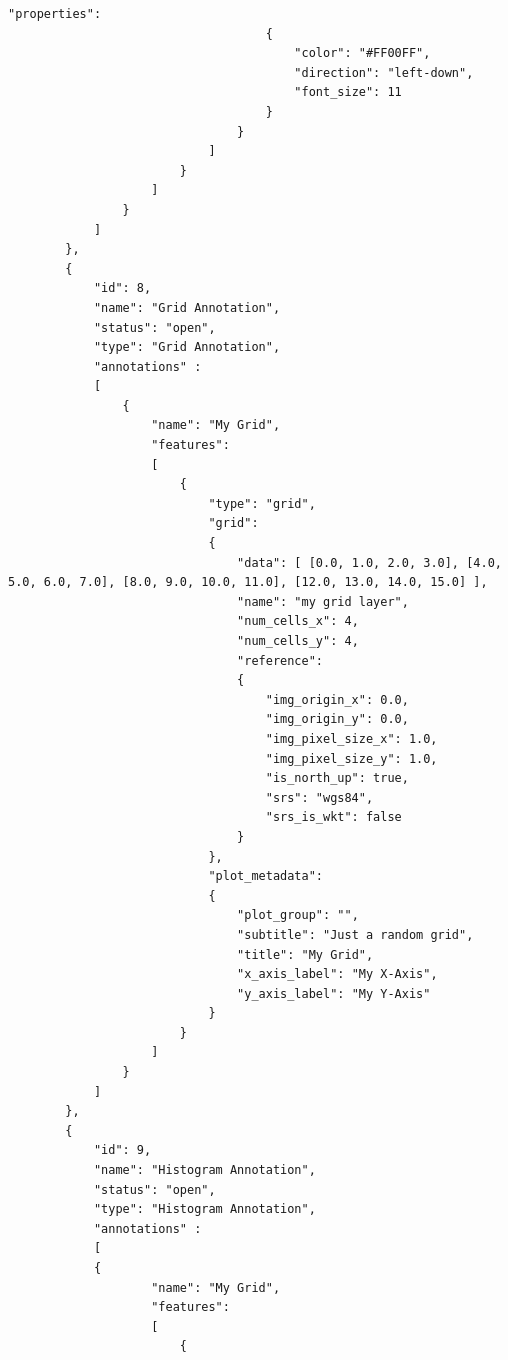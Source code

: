 \begin{lstlisting}[basicstyle=\small\ttfamily]
                                    "properties":
                                    {
                                        "color": "#FF00FF",
                                        "direction": "left-down",
                                        "font_size": 11
                                    }
                                }
                            ]
                        }
                    ]
                }                
            ]
        },
        {
            "id": 8,
            "name": "Grid Annotation",
            "status": "open",
            "type": "Grid Annotation",
            "annotations" :
            [
                {
                    "name": "My Grid",
                    "features":
                    [
                        {
                            "type": "grid",
                            "grid": 
                            {
                                "data": [ [0.0, 1.0, 2.0, 3.0], [4.0, 5.0, 6.0, 7.0], [8.0, 9.0, 10.0, 11.0], [12.0, 13.0, 14.0, 15.0] ],
                                "name": "my grid layer",
                                "num_cells_x": 4,
                                "num_cells_y": 4,
                                "reference": 
                                {
                                    "img_origin_x": 0.0,     
                                    "img_origin_y": 0.0,     
                                    "img_pixel_size_x": 1.0, 
                                    "img_pixel_size_y": 1.0, 
                                    "is_north_up": true,    
                                    "srs": "wgs84",        
                                    "srs_is_wkt": false  
                                }
                            },
                            "plot_metadata": 
                            {
                                "plot_group": "",
                                "subtitle": "Just a random grid",
                                "title": "My Grid",
                                "x_axis_label": "My X-Axis",
                                "y_axis_label": "My Y-Axis"
                            }
                        }                
                    ]
                }
            ]
        },
        {
            "id": 9,
            "name": "Histogram Annotation",
            "status": "open",
            "type": "Histogram Annotation",
            "annotations" :
            [
            {
                    "name": "My Grid",
                    "features":
                    [
                        {

\end{lstlisting}

